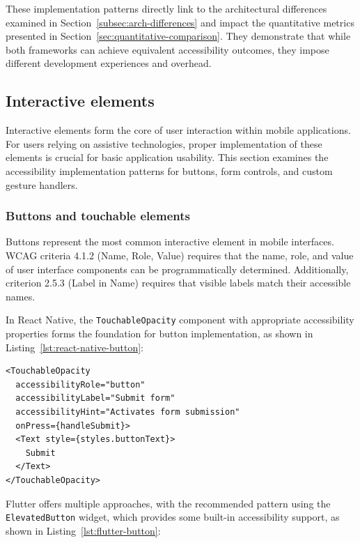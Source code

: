 These implementation patterns directly link to the architectural differences examined in Section~\ref{subsec:arch-differences} and impact the quantitative metrics presented in Section~\ref{sec:quantitative-comparison}. They demonstrate that while both frameworks can achieve equivalent accessibility outcomes, they impose different development experiences and overhead.

\subsection{Interactive elements}
\label{subsec:interactive-elements}

Interactive elements form the core of user interaction within mobile applications. For users relying on assistive technologies, proper implementation of these elements is crucial for basic application usability. This section examines the accessibility implementation patterns for buttons, form controls, and custom gesture handlers.

\subsubsection{Buttons and touchable elements}
\label{subsubsec:buttons-implementation}

Buttons represent the most common interactive element in mobile interfaces. WCAG criteria 4.1.2 (Name, Role, Value) requires that the name, role, and value of user interface components can be programmatically determined. Additionally, criterion 2.5.3 (Label in Name) requires that visible labels match their accessible names.

In React Native, the \texttt{TouchableOpacity} component with appropriate accessibility properties forms the foundation for button implementation, as shown in Listing~\ref{lst:react-native-button}:

\begin{lstlisting}[style=ReactNativeStyle, caption=Accessible button in React Native, label=lst:react-native-button]
<TouchableOpacity
  accessibilityRole="button"
  accessibilityLabel="Submit form"
  accessibilityHint="Activates form submission"
  onPress={handleSubmit}>
  <Text style={styles.buttonText}>
    Submit
  </Text>
</TouchableOpacity>
\end{lstlisting}

Flutter offers multiple approaches, with the recommended pattern using the \texttt{ElevatedButton} widget, which provides some built-in accessibility support, as shown in Listing~\ref{lst:flutter-button}:

